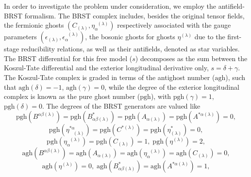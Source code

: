 \documentclass[a4paper,12pt]{article}
\begin{document}
In order to investigate the problem under consideration, we employ the
antifield-BRST formalism. The BRST complex includes, besides the original
tensor fields, the fermionic ghosts $\left( C_{(\lambda )},\eta _{\alpha
}^{\;\;(\lambda )}\right) $ respectively associated with the gauge
parameters $\left( \epsilon _{(\lambda )},\epsilon _{\alpha }^{\;\;(\lambda
)}\right) $, the bosonic ghosts for ghosts $\eta ^{(\lambda )}$ due to the
first-stage reducibility relations, as well as their antifields, denoted as
star variables. The BRST differential for this free model ($s$) decomposes
as the sum between the Koszul-Tate differential and the exterior
longitudinal derivative only, $s=\delta +\gamma $. The Koszul-Tate complex
is graded in terms of the antighost number ($\mathrm{agh}$), such that $%
\mathrm{agh}\left( \delta \right) =-1$, $\mathrm{agh}\left( \gamma \right) =0
$, while the degree of the exterior longitudinal complex is known as the
pure ghost number ($\mathrm{pgh}$), with $\mathrm{pgh}\left( \gamma \right)
=1$, $\mathrm{pgh}\left( \delta \right) =0$. The degrees of the BRST
generators are valued like
\begin{equation}
\mathrm{pgh}\left( B^{\alpha \beta (\lambda )}\right) =\mathrm{pgh}\left(
B_{\alpha \beta (\lambda )}^{*}\right) =\mathrm{pgh}\left( A_{\alpha
(\lambda )}\right) =\mathrm{pgh}\left( A^{*\alpha (\lambda )}\right) =0,
\label{cin4}
\end{equation}
\begin{equation}
\mathrm{pgh}\left( \eta _{\;\;\;(\lambda )}^{*\alpha }\right) =\mathrm{pgh}%
\left( C^{*(\lambda )}\right) =\mathrm{pgh}\left( \eta _{(\lambda
)}^{*}\right) =0,  \label{cin5}
\end{equation}
\begin{equation}
\mathrm{pgh}\left( \eta _{\alpha }^{\;\;(\lambda )}\right) =\mathrm{pgh}%
\left( C_{(\lambda )}\right) =1,\;\mathrm{pgh}\left( \eta ^{(\lambda
)}\right) =2,  \label{cin6}
\end{equation}
\begin{equation}
\mathrm{agh}\left( B^{\alpha \beta (\lambda )}\right) =\mathrm{agh}\left(
A_{\alpha (\lambda )}\right) =\mathrm{agh}\left( \eta _{\alpha
}^{\;\;(\lambda )}\right) =\mathrm{agh}\left( C_{(\lambda )}\right) =0,
\label{cin7}
\end{equation}
\begin{equation}
\mathrm{agh}\left( \eta ^{(\lambda )}\right) =0,\;\mathrm{agh}\left(
B_{\alpha \beta (\lambda )}^{*}\right) =\mathrm{agh}\left( A^{*\alpha
(\lambda )}\right) =1,  \label{cin8}
\end{equation}
\end{document}
